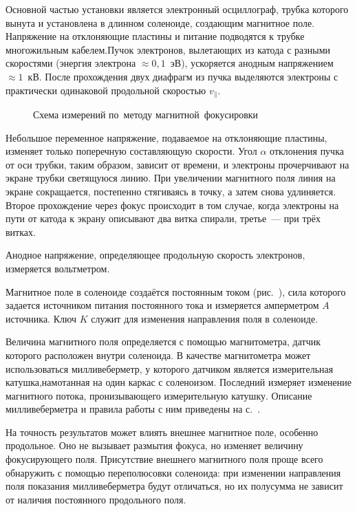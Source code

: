 \experiment Основной частью установки является электронный осциллограф, трубка которого вынута и установлена в длинном соленоиде, создающим магнитное поле. Напряжение на отклоняющие пластины и питание подводятся к трубке многожильным кабелем.Пучок электронов, вылетающих из катода с разными скоростями (энергия электрона $\approx 0,1$~эВ), ускоряется анодным напряжением $\approx 1$~кВ. После прохождения двух диафрагм из пучка выделяются электроны с практически одинаковой продольной скоростью $v_{\parallel}$. 
\begin{figure}[h!]
	\caption{ Схема измерений по~методу магнитной~фокусировки}
\end{figure}
Небольшое переменное напряжение, подаваемое на отклоняющие пластины, изменяет только поперечную составляющую скорости. Угол $\alpha$ отклонения пучка от оси трубки, таким образом, зависит от времени, и электроны прочерчивают на экране трубки светящуюся линию. При увеличении магнитного поля линия на экране сокращается, постепенно стягиваясь в точку, а затем снова удлиняется. Второе прохождение через фокус происходит в том случае, когда электроны на пути от катода к экрану описывают два витка спирали, третье~--- при трёх витках.

Анодное напряжение, определяющее продольную скорость электронов, измеряется вольтметром.

Магнитное поле в соленоиде создаётся постоянным током (рис.~), сила которого задается источником питания постоянного тока и измеряется амперметром $A$ источника. Ключ $K$ служит для изменения направления поля в соленоиде.

Величина магнитного поля определяется с помощью магнитометра, датчик которого расположен внутри соленоида. В качестве магнитометра  может использоваться милливеберметр, у которого датчиком является измерительная катушка,намотанная на один каркас с соленоизом. Последний измеряет изменение магнитного потока, пронизывающего измерительную катушку. Описание милливеберметра и правила работы с ним приведены на с.~\pageref{MWB}.

На точность результатов может влиять внешнее магнитное поле, особенно продольное. Оно не вызывает размытия фокуса, но изменяет величину фокусирующего поля. Присутствие внешнего магнитного поля проще всего обнаружить с помощью переполюсовки соленоида: при изменении направления поля показания милливеберметра будут отличаться, но их полусумма не зависит от наличия постоянного продольного поля.

